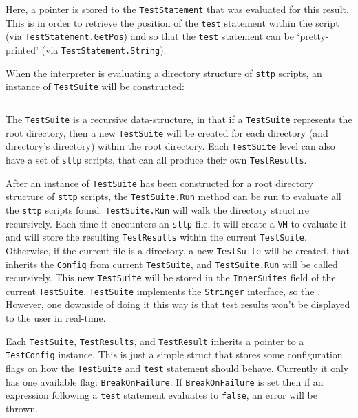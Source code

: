 Here, a pointer is stored to the \verb|TestStatement| that was evaluated for this result. This is in order to retrieve the position of the \verb|test| statement within the script (via \verb|TestStatement.GetPos|) and so that the \verb|test| statement can be `pretty-printed' (via \verb|TestStatement.String|).

When the interpreter is evaluating a directory structure of \verb|sttp| scripts, an instance of \verb|TestSuite| will be constructed:

\inputminted[firstline=76, lastline=86, autogobble, breaklines, tabsize=4]{go}{../../src/test.go}

The \verb|TestSuite| is a recursive data-structure, in that if a \verb|TestSuite| represents the root directory, then a new \verb|TestSuite| will be created for each directory (and directory's directory) within the root directory. Each \verb|TestSuite| level can also have a set of \verb|sttp| scripts, that can all produce their own \verb|TestResults|.

After an instance of \verb|TestSuite| has been constructed for a root directory structure of \verb|sttp| scripts, the \verb|TestSuite.Run| method can be run to evaluate all the \verb|sttp| scripts found. \verb|TestSuite.Run| will walk the directory structure recursively. Each time it encounters an \verb|sttp| file, it will create a \verb|VM| to evaluate it and will store the resulting \verb|TestResults| within the current \verb|TestSuite|. Otherwise, if the current file is a directory, a new \verb|TestSuite| will be created, that inherits the \verb|Config| from current \verb|TestSuite|, and \verb|TestSuite.Run| will be called recursively. This new \verb|TestSuite| will be stored in the \verb|InnerSuites| field of the current \verb|TestSuite|. \verb|TestSuite| implements the \verb|Stringer| interface, so the . However, one downside of doing it this way is that test results won't be displayed to the user in real-time.

Each \verb|TestSuite|, \verb|TestResults|, and \verb|TestResult| inherits a pointer to a \verb|TestConfig| instance. This is just a simple struct that stores some configuration flags on how the \verb|TestSuite| and \verb|test| statement should behave. Currently it only has one available flag: \verb|BreakOnFailure|. If \verb|BreakOnFailure| is set then if an expression following a \verb|test| statement evaluates to \verb|false|, an error will be thrown.
